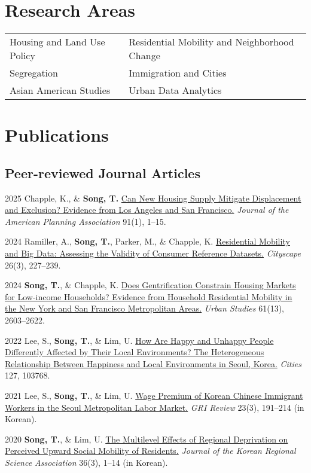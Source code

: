 \documentclass[11pt,letterpaper]{article}
\begin{document}
\section{Research Areas}
\begin{tabular}{@{}p{} p{}@{}}
Housing and Land Use Policy & Residential Mobility and Neighborhood Change\\
Segregation & Immigration and Cities\\
Asian American Studies & Urban Data Analytics
\end{tabular}

\section{Publications}

\subsection{Peer-reviewed Journal Articles}
\begin{tablist}
  \item[2025] \tab{}Chapple, K., \& \textbf{Song, T.} \href{https://doi.org/10.1080/01944363.2024.2319293}{Can New Housing Supply Mitigate Displacement and Exclusion? Evidence from Los Angeles and San Francisco.} \emph{Journal of the American Planning Association} 91(1), 1–15.
  \item[2024] \tab{}Ramiller, A., \textbf{Song, T.}, Parker, M., \& Chapple, K. \href{https://www.jstor.org/stable/48799257}{Residential Mobility and Big Data: Assessing the Validity of Consumer Reference Datasets.} \emph{Cityscape} 26(3), 227–239.
  \item[2024] \tab{}\textbf{Song, T.}, \& Chapple, K. \href{https://doi.org/10.1177/00420980241244699}{Does Gentrification Constrain Housing Markets for Low-income Households? Evidence from Household Residential Mobility in the New York and San Francisco Metropolitan Areas.} \emph{Urban Studies} 61(13), 2603–2622.
  \item[2022] \tab{}Lee, S., \textbf{Song, T.}, \& Lim, U. \href{https://doi.org/10.1016/j.cities.2022.103768}{How Are Happy and Unhappy People Differently Affected by Their Local Environments? The Heterogeneous Relationship Between Happiness and Local Environments in Seoul, Korea.} \emph{Cities} 127, 103768.
  \item[2021] \tab{}Lee, S., \textbf{Song, T.}, \& Lim, U. \href{https://www.dbpia.co.kr/Journal/articleDetail?nodeId=NODE11025769}{Wage Premium of Korean Chinese Immigrant Workers in the Seoul Metropolitan Labor Market.} \emph{GRI Review} 23(3), 191–214 (in Korean).
  \item[2020] \tab{}\textbf{Song, T.}, \& Lim, U. \href{https://www.koreascience.or.kr/article/JAKO202030161655441.page}{The Multilevel Effects of Regional Deprivation on Perceived Upward Social Mobility of Residents.} \emph{Journal of the Korean Regional Science Association} 36(3), 1–14 (in Korean).
\end{tablist}
\end{document}
